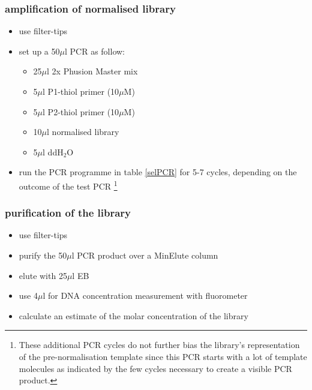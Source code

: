 \subsubsection
{amplification of normalised library}
\begin{itemize}
\item {\color{red}use filter-tips}
\item set up a 50$\mu$l PCR as follow:
	\begin{itemize}
	\item 25$\mu$l 2x Phusion Master mix
	\item 5$\mu$l P1-thiol primer (10$\mu$M)
	\item 5$\mu$l P2-thiol primer (10$\mu$M)
	\item 10$\mu$l normalised library
	\item 5$\mu$l ddH$_{2}$O
	\end{itemize}
\item run the PCR programme in table \ref{selPCR} for 5-7 cycles, depending on the outcome of the test PCR \footnote{These additional PCR cycles do not further bias the library's representation of the pre-normalisation template since this PCR starts with a lot of template molecules as indicated by the few cycles necessary to create a visible PCR product.}
\end{itemize}

\subsubsection
{purification of the library}
\begin{itemize}
\item {\color{red}use filter-tips}
\item purify the 50$\mu$l PCR product over a MinElute column
\item elute with 25$\mu$l EB
\item use 4$\mu$l for DNA concentration measurement with fluorometer
\item calculate an estimate of the molar concentration of the library
\end{itemize}


